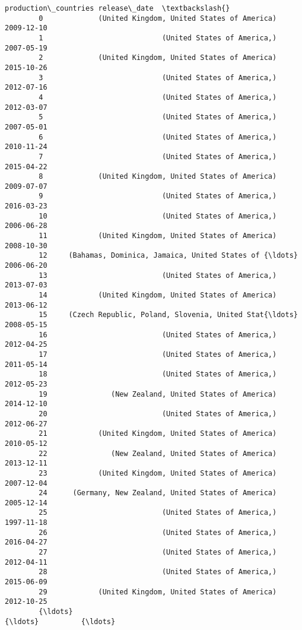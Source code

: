 \documentclass[11pt]{article}
\begin{document}
\begin{Verbatim}[commandchars=\\\{\}]
                                            production\_countries release\_date  \textbackslash{}
        0             (United Kingdom, United States of America)   2009-12-10   
        1                            (United States of America,)   2007-05-19   
        2             (United Kingdom, United States of America)   2015-10-26   
        3                            (United States of America,)   2012-07-16   
        4                            (United States of America,)   2012-03-07   
        5                            (United States of America,)   2007-05-01   
        6                            (United States of America,)   2010-11-24   
        7                            (United States of America,)   2015-04-22   
        8             (United Kingdom, United States of America)   2009-07-07   
        9                            (United States of America,)   2016-03-23   
        10                           (United States of America,)   2006-06-28   
        11            (United Kingdom, United States of America)   2008-10-30   
        12     (Bahamas, Dominica, Jamaica, United States of {\ldots}   2006-06-20   
        13                           (United States of America,)   2013-07-03   
        14            (United Kingdom, United States of America)   2013-06-12   
        15     (Czech Republic, Poland, Slovenia, United Stat{\ldots}   2008-05-15   
        16                           (United States of America,)   2012-04-25   
        17                           (United States of America,)   2011-05-14   
        18                           (United States of America,)   2012-05-23   
        19               (New Zealand, United States of America)   2014-12-10   
        20                           (United States of America,)   2012-06-27   
        21            (United Kingdom, United States of America)   2010-05-12   
        22               (New Zealand, United States of America)   2013-12-11   
        23            (United Kingdom, United States of America)   2007-12-04   
        24      (Germany, New Zealand, United States of America)   2005-12-14   
        25                           (United States of America,)   1997-11-18   
        26                           (United States of America,)   2016-04-27   
        27                           (United States of America,)   2012-04-11   
        28                           (United States of America,)   2015-06-09   
        29            (United Kingdom, United States of America)   2012-10-25   
        {\ldots}                                                  {\ldots}          {\ldots}   

\end{Verbatim}
\end{document}
